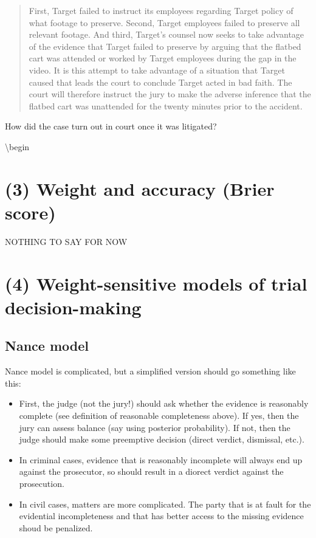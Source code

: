 \documentclass[
  10pt,
  dvipsnames,enabledeprecatedfontcommands]{scrartcl}
\begin{document}
\begin{quote}
First, Target failed to instruct its employees regarding Target policy of what footage to preserve. Second, Target employees failed to preserve all relevant footage. And third, Target’s counsel now seeks to take advantage of the evidence that Target failed to preserve by arguing that the flatbed cart was attended or worked by Target employees during the gap in the video. It is this attempt to take advantage of a situation that Target caused that leads the court to conclude Target acted in bad faith. The court will therefore instruct the jury to make the adverse inference that the flatbed cart was unattended for the twenty minutes prior to the accident.
\end{quote}

How did the case turn out in court once it was litigated?

\textbackslash begin

\hypertarget{weight-and-accuracy-brier-score}{%
\section{(3) Weight and accuracy (Brier
score)}\label{weight-and-accuracy-brier-score}}

NOTHING TO SAY FOR NOW

\hypertarget{weight-sensitive-models-of-trial-decision-making}{%
\section{(4) Weight-sensitive models of trial
decision-making}\label{weight-sensitive-models-of-trial-decision-making}}

\hypertarget{nance-model}{%
\subsection{Nance model}\label{nance-model}}

Nance model is complicated, but a simplified version should go something
like this:

\begin{itemize}
\item
  First, the judge (not the jury!) should ask whether the evidence is
  reasonably complete (see definition of reasonable completeness above).
  If yes, then the jury can assess balance (say using posterior
  probability). If not, then the judge should make some preemptive
  decision (direct verdict, dismissal, etc.).
\item
  In criminal cases, evidence that is reasonably incomplete will always
  end up against the prosecutor, so should result in a diorect verdict
  against the prosecution.
\item
  In civil cases, matters are more complicated. The party that is at
  fault for the evidential incompleteness and that has better access to
  the missing evidence shoud be penalized.
\end{itemize}
\end{document}
